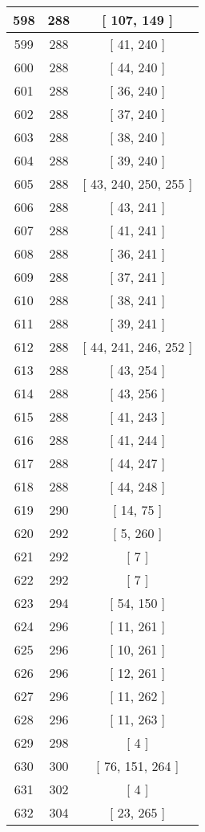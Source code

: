 \begin{center}
\begin{longtable}[H]{|| c c c ||}
\hline
598 & 288 & [ 107, 149 ] \\ 
\hline
599 & 288 & [ 41, 240 ] \\ 
\hline
600 & 288 & [ 44, 240 ] \\ 
\hline
601 & 288 & [ 36, 240 ] \\ 
\hline
602 & 288 & [ 37, 240 ] \\ 
\hline
603 & 288 & [ 38, 240 ] \\ 
\hline
604 & 288 & [ 39, 240 ] \\ 
\hline
605 & 288 & [ 43, 240, 250, 255 ] \\ 
\hline
606 & 288 & [ 43, 241 ] \\ 
\hline
607 & 288 & [ 41, 241 ] \\ 
\hline
608 & 288 & [ 36, 241 ] \\ 
\hline
609 & 288 & [ 37, 241 ] \\ 
\hline
610 & 288 & [ 38, 241 ] \\ 
\hline
611 & 288 & [ 39, 241 ] \\ 
\hline
612 & 288 & [ 44, 241, 246, 252 ] \\ 
\hline
613 & 288 & [ 43, 254 ] \\ 
\hline
614 & 288 & [ 43, 256 ] \\ 
\hline
615 & 288 & [ 41, 243 ] \\ 
\hline
616 & 288 & [ 41, 244 ] \\ 
\hline
617 & 288 & [ 44, 247 ] \\ 
\hline
618 & 288 & [ 44, 248 ] \\ 
\hline
619 & 290 & [ 14, 75 ] \\ 
\hline
620 & 292 & [ 5, 260 ] \\ 
\hline
621 & 292 & [ 7 ] \\ 
\hline
622 & 292 & [ 7 ] \\ 
\hline
623 & 294 & [ 54, 150 ] \\ 
\hline
624 & 296 & [ 11, 261 ] \\ 
\hline
625 & 296 & [ 10, 261 ] \\ 
\hline
626 & 296 & [ 12, 261 ] \\ 
\hline
627 & 296 & [ 11, 262 ] \\ 
\hline
628 & 296 & [ 11, 263 ] \\ 
\hline
629 & 298 & [ 4 ] \\ 
\hline
630 & 300 & [ 76, 151, 264 ] \\ 
\hline
631 & 302 & [ 4 ] \\ 
\hline
632 & 304 & [ 23, 265 ] \\ 

\end{longtable}
\end{center}
